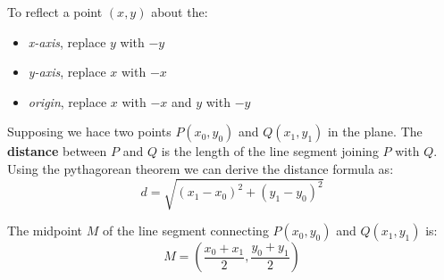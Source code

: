 \begin{definition}[Reflections]
    To reflect a point $(x, y)$ about the:
    \begin{itemize}
        \item \textit{x-axis}, replace $y$ with $-y$
        \item \textit{y-axis}, replace $x$ with $-x$
        \item \textit{origin}, replace $x$ with $-x$ and $y$ with $-y$
    \end{itemize}
\end{definition}

\begin{definition}[Distance]
    Supposing we hace two points $P(x_0,y_0)$ and $Q(x_1,y_1)$ in the plane. The \textbf{distance} between $P$ and $Q$ is the length of the line segment joining $P$ with $Q$. Using the pythagorean theorem we can derive the distance formula as:
    \[
        d = \sqrt{(x_1-x_0)^2 + (y_1-y_0)^2}
    \]
\end{definition}

\begin{definition}
    The midpoint $M$ of the line segment connecting $P(x_0,y_0)$ and $Q(x_1,y_1)$ is:
    \[
        M = (\frac{x_0+x_1}{2}, \frac{y_0+y_1}{2})
    \]
\end{definition}


